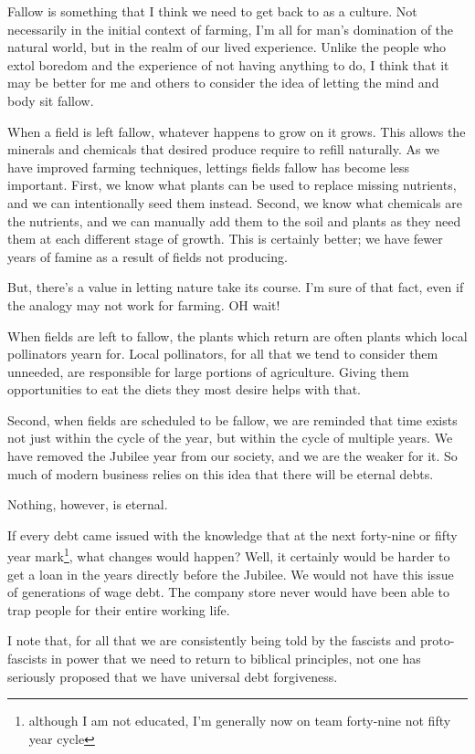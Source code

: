 \documentclass[12pt]{article}
\renewcommand{\,}{\textsuperscript{,}}
\begin{document}
Fallow is something that I think we need to get back to as a culture.  
Not necessarily in the initial context of farming, I'm all for man's domination of the natural world, but in the realm of our lived experience.  
Unlike the people who extol boredom and the experience of not having anything to do, I think that it may be better for me and others to consider the idea of letting the mind and body sit fallow.

When a field is left fallow, whatever happens to grow on it grows.  
This allows the minerals and chemicals that desired produce require to refill naturally.  
As we have improved farming techniques, lettings fields fallow has become less important.  
First, we know what plants can be used to replace missing nutrients, and we can intentionally seed them instead.  
Second, we know what chemicals are the nutrients, and we can manually add them to the soil and plants as they need them at each different stage of growth.  
This is certainly better; we have fewer years of famine as a result of fields not producing.

But, there's a value in letting nature take its course.  
I'm sure of that fact, even if the analogy may not work for farming.  
OH wait!

When fields are left to fallow, the plants which return are often plants which local pollinators yearn for.  
Local pollinators, for all that we tend to consider them unneeded, are responsible for large portions of agriculture.  
Giving them opportunities to eat the diets they most desire helps with that.

Second, when fields are scheduled to be fallow, we are reminded that time exists not just within the cycle of the year, but within the cycle of multiple years.  
We have removed the Jubilee year from our society, and we are the weaker for it.  
So much of modern business relies on this idea that there will be eternal debts.

Nothing, however, is eternal.

If every debt came issued with the knowledge that at the next forty-nine or fifty year mark\footnote{although I am not educated, I'm generally now on team forty-nine not fifty year cycle}, what changes would happen?  
Well, it certainly would be harder to get a loan in the years directly before the Jubilee.  
We would not have this issue of generations of wage debt.  
The company store never would have been able to trap people for their entire working life.

I note that, for all that we are consistently being told by the fascists and proto-fascists in power that we need to return to biblical principles, not one has seriously proposed that we have universal debt forgiveness.
\end{document}
